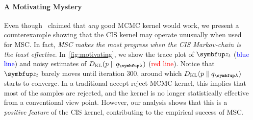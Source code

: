 
\vspace{-0.1in}
\paragraph{A Motivating Mystery}
Even though~\citeauthor{NEURIPS2020_b2070693} claimed that \textit{any} good MCMC kernel would work, we present a counterexample showing that the CIS kernel may operate unusually when used for MSC.
In fact, \textit{MSC makes the most progress when the CIS Markov-chain is the least effective}.
In~\cref{fig:motivating}, we show the trace plot of \(\vz_t\) (\textcolor{blue}{blue line}) and noisy estimates of \(\DKL{p}{q_{\vlambda}}\) (\textcolor{red}{red line}).
Notice that \(\vz_t\) barely moves until iteration 300, around which \(\DKL{p}{q_{\vlambda}}\) starts to converge.
In a traditional accept-reject MCMC kernel, this implies that most of the samples are rejected, and the kernel is no longer statistically effective from a conventional view point.
However, our analysis shows that this is a \textit{positive feature} of the CIS kernel, contributing to the empirical success of MSC.


%

